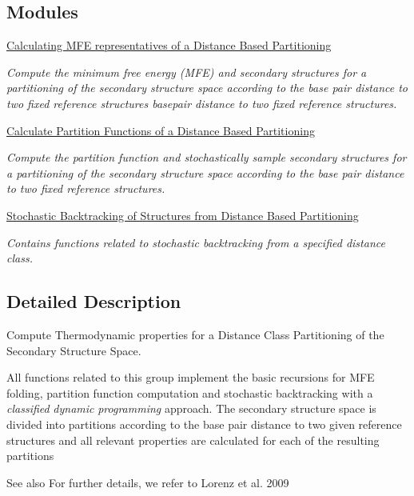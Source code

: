 \subsection*{Modules}
\begin{DoxyCompactItemize}
\item 
\hyperlink{group__kl__neighborhood__mfe}{Calculating M\+F\+E representatives of a Distance Based Partitioning}
\begin{DoxyCompactList}\small\item\em Compute the minimum free energy (M\+F\+E) and secondary structures for a partitioning of the secondary structure space according to the base pair distance to two fixed reference structures basepair distance to two fixed reference structures. \end{DoxyCompactList}\item 
\hyperlink{group__kl__neighborhood__pf}{Calculate Partition Functions of a Distance Based Partitioning}
\begin{DoxyCompactList}\small\item\em Compute the partition function and stochastically sample secondary structures for a partitioning of the secondary structure space according to the base pair distance to two fixed reference structures. \end{DoxyCompactList}\item 
\hyperlink{group__kl__neighborhood__stochbt}{Stochastic Backtracking of Structures from Distance Based Partitioning}
\begin{DoxyCompactList}\small\item\em Contains functions related to stochastic backtracking from a specified distance class. \end{DoxyCompactList}\end{DoxyCompactItemize}


\subsection{Detailed Description}
Compute Thermodynamic properties for a Distance Class Partitioning of the Secondary Structure Space. 

All functions related to this group implement the basic recursions for M\+F\+E folding, partition function computation and stochastic backtracking with a {\itshape classified} {\itshape dynamic} {\itshape programming} approach. The secondary structure space is divided into partitions according to the base pair distance to two given reference structures and all relevant properties are calculated for each of the resulting partitions \begin{DoxySeeAlso}{See also}
For further details, we refer to Lorenz et al. 2009 \cite{lorenz:2009} 
\end{DoxySeeAlso}

